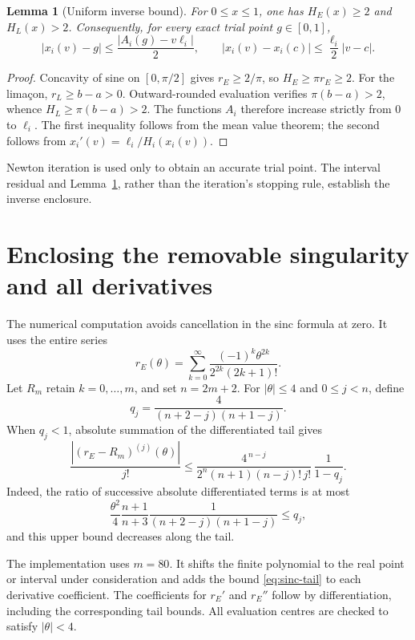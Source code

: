 \documentclass[10pt,a4paper]{article}
\newtheorem{lemma}{Lemma}
\begin{document}
\begin{lemma}[Uniform inverse bound]\label{lem:inverse}
For \(0\leq x\leq1\), one has \(H_E(x)\geq2\) and \(H_L(x)>2\).
Consequently, for every exact trial point \(g\in[0,1]\),
\begin{equation}\label{eq:residual}
|x_i(v)-g|\leq\frac{|A_i(g)-v\ell_i|}{2},
\qquad
|x_i(v)-x_i(c)|\leq\frac{\ell_i}{2}|v-c|.
\end{equation}
\end{lemma}
\begin{proof}
Concavity of sine on \([0,\pi/2]\) gives \(r_E\geq2/\pi\), so
\(H_E\geq\pi r_E\geq2\).
For the lima\c{c}on, \(r_L\geq b-a>0\). Outward-rounded evaluation verifies
\(\pi(b-a)>2\), whence \(H_L\geq\pi(b-a)>2\).
The functions \(A_i\) therefore increase strictly from \(0\) to \(\ell_i\).
The first inequality follows from the mean value theorem; the second follows
from \(x_i'(v)=\ell_i/H_i(x_i(v))\).
\end{proof}

Newton iteration is used only to obtain an accurate trial point.
The interval residual and Lemma~\ref{lem:inverse}, rather than the iteration's
stopping rule, establish the inverse enclosure.

\section{Enclosing the removable singularity and all derivatives}
The numerical computation avoids cancellation in the sinc formula at zero.
It uses the entire series
\[
r_E(\theta)=\sum_{k=0}^{\infty}
  \frac{(-1)^k\theta^{2k}}{2^{2k}(2k+1)!}.
\]
Let \(R_m\) retain \(k=0,\ldots,m\), and set \(n=2m+2\).
For \(|\theta|\leq4\) and \(0\leq j<n\), define
\[
q_j=\frac{4}{(n+2-j)(n+1-j)}.
\]
When \(q_j<1\), absolute summation of the differentiated tail gives
\begin{equation}\label{eq:sinc-tail}
\frac{|(r_E-R_m)^{(j)}(\theta)|}{j!}
\leq
\frac{4^{\,n-j}}
 {2^n(n+1)(n-j)!\,j!}\,\frac{1}{1-q_j}.
\end{equation}
Indeed, the ratio of successive absolute differentiated terms is at most
\[
\frac{\theta^2}{4}
\frac{n+1}{n+3}
\frac{1}{(n+2-j)(n+1-j)}
\leq q_j,
\]
and this upper bound decreases along the tail.

The implementation uses \(m=80\). It shifts the finite polynomial to the real
point or interval under consideration and adds the bound
\eqref{eq:sinc-tail} to each derivative coefficient.
The coefficients for \(r_E'\) and \(r_E''\) follow by differentiation, including
the corresponding tail bounds. All evaluation centres are checked to satisfy
\(|\theta|<4\).
\end{document}
